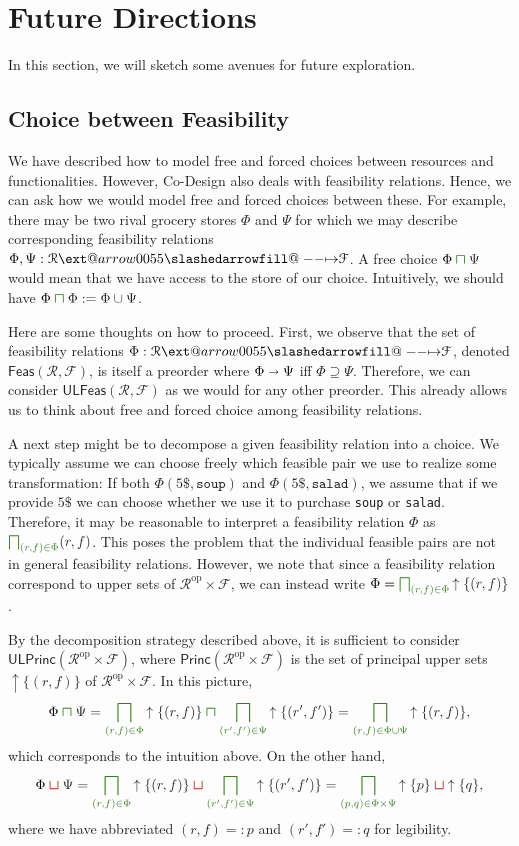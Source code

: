 \documentclass[12pt]{article}
\makeatletter
\theoremstyle{definition}
\theoremstyle{plain}
\theoremstyle{plain}
\theoremstyle{plain}
\theoremstyle{plain}
\theoremstyle{remark}
\theoremstyle{remark}
\newcommand{\mc}[1]{\mathcal{#1}}
\newcommand{\low}{\mathsf{L}}
\newcommand{\upper}{\mathsf{U}}
\newcommand{\upc}[1]{{\uparrow #1}}
\def\slashedarrowfill@#1#2#3#4#5{%
	$\m@th\thickmuskip0mu\medmuskip\thickmuskip\thinmuskip\thickmuskip
	\relax#5#1\mkern-7mu%
	\cleaders\hbox{$#5\mkern-2mu#2\mkern-2mu$}\hfill
	\mathclap{#3}\mathclap{#2}%
	\cleaders\hbox{$#5\mkern-2mu#2\mkern-2mu$}\hfill
	\mkern-7mu#4$%
}
\def\rightslashedarrowfill@{%
	\slashedarrowfill@\relbar\relbar\mapstochar\rightarrow}
\newcommand\xslashedrightarrow[2][]{%
	\ext@arrow 0055{\rightslashedarrowfill@}{#1}{#2}}
\newcommand{\cbigsqcap}[1]{\color{OliveGreen}\bigsqcap_{#1}\color{Black}}
\newcommand{\csqcap}{\color{OliveGreen}\bm{\sqcap}\color{Black}}
\newcommand{\csqcup}{\color{BrickRed}\bm{\sqcup}\color{Black}}
\makeatother
\begin{document}
\newpage
\section{Future Directions}
In this section, we will sketch some avenues for future exploration.

\subsection{Choice between Feasibility}
We have described how to model free and forced choices between resources and functionalities. However, Co-Design also deals with feasibility relations. Hence, we can ask how we would model free and forced choices between these. For example, there may be two rival grocery stores $\Phi$ and $\Psi$ for which we may describe corresponding feasibility relations $\Phi,\Psi: \mc{R} \xslashedrightarrow{} \mc{F}$. A free choice $\Phi \csqcap \Psi$ would mean that we have access to the store of our choice. Intuitively, we should have $\Phi \csqcap \Phi := \Phi \cup \Psi$.

Here are some thoughts on how to proceed. First, we observe that the set of feasibility relations $\Phi: \mc{R} \xslashedrightarrow{} \mc{F}$, denoted $\mathsf{Feas}(\mc{R},\mc{F})$, is itself a preorder where $\Phi \shortrightarrow \Psi$ iff $\Phi \supseteq \Psi$. Therefore, we can consider $\upper\low\mathsf{Feas}(\mc{R},\mc{F})$ as we would for any other preorder. This already allows us to think about free and forced choice among feasibility relations.

A next step might be to decompose a given feasibility relation into a choice. We typically assume we can choose freely which feasible pair we use to realize some transformation: If both $\Phi(5\$,\mathtt{soup})$ and $\Phi(5\$,\mathtt{salad})$, we assume that if we provide $5\$$ we can choose whether we use it to purchase \texttt{soup} or \texttt{salad}. Therefore, it may be reasonable to interpret a feasibility relation $\Phi$ as $\cbigsqcap{(r,f) \in \Phi} (r,f)$. This poses the problem that the individual feasible pairs are not in general feasibility relations. However, we note that since a feasibility relation correspond to upper sets of $\mc{R}^\text{op} \times \mc{F}$, we can instead write $\Phi = \cbigsqcap{(r,f) \in \Phi} \upc \{(r,f)\}$.

By the decomposition strategy described above, it is sufficient to consider $\upper\low\mathsf{Princ}(\mc{R}^\text{op} \times \mc{F})$, where $\mathsf{Princ}(\mc{R}^\text{op} \times \mc{F})$ is the set of principal upper sets $\upc\{(r,f)\}$ of $\mc{R}^\text{op} \times \mc{F}$. In this picture, 
$$\Phi \csqcap \Psi = \cbigsqcap{(r,f) \in \Phi} \upc \{(r,f)\} \csqcap \cbigsqcap{(r',f') \in \Psi} \upc \{(r',f')\} = \cbigsqcap{(r,f) \in \Phi \cup \Psi} \upc \{(r,f)\},$$
which corresponds to the intuition above. On the other hand,
$$ \Phi \csqcup \Psi = \cbigsqcap{(r,f) \in \Phi} \upc \{(r,f)\} \csqcup \cbigsqcap{(r',f') \in \Psi} \upc \{(r',f')\} = \cbigsqcap{(p,q) \in \Phi \times \Psi} \upc\{p\} \csqcup \upc\{q\} ,$$
where we have abbreviated $(r,f) =: p$ and $(r',f') =: q$ for legibility.
\end{document}
